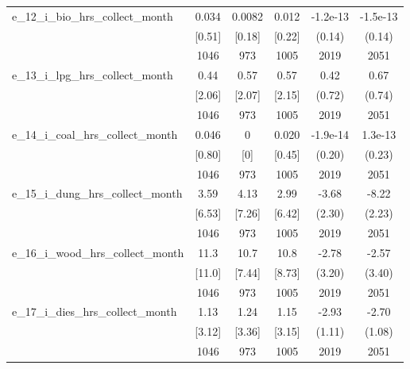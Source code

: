 \begin{table}[htbp]
\begin{tabular*}{0.9\hsize}{@{\hskip\tabcolsep\extracolsep\fill}l*{1}{ccccc}}
e\_12\_i\_bio\_hrs\_collect\_month    &    0.034&   0.0082&    0.012& -1.2e-13         & -1.5e-13         \\
                                &   [0.51]&   [0.18]&   [0.22]&   (0.14)         &   (0.14)         \\
                                &     1046&      973&     1005&     2019         &     2051         \\
e\_13\_i\_lpg\_hrs\_collect\_month    &     0.44&     0.57&     0.57&     0.42         &     0.67         \\
                                &   [2.06]&   [2.07]&   [2.15]&   (0.72)         &   (0.74)         \\
                                &     1046&      973&     1005&     2019         &     2051         \\
e\_14\_i\_coal\_hrs\_collect\_month   &    0.046&        0&    0.020& -1.9e-14         &  1.3e-13         \\
                                &   [0.80]&      [0]&   [0.45]&   (0.20)         &   (0.23)         \\
                                &     1046&      973&     1005&     2019         &     2051         \\
e\_15\_i\_dung\_hrs\_collect\_month   &     3.59&     4.13&     2.99&    -3.68         &    -8.22\sym{***}\\
                                &   [6.53]&   [7.26]&   [6.42]&   (2.30)         &   (2.23)         \\
                                &     1046&      973&     1005&     2019         &     2051         \\
e\_16\_i\_wood\_hrs\_collect\_month   &     11.3&     10.7&     10.8&    -2.78         &    -2.57         \\
                                &   [11.0]&   [7.44]&   [8.73]&   (3.20)         &   (3.40)         \\
                                &     1046&      973&     1005&     2019         &     2051         \\
e\_17\_i\_dies\_hrs\_collect\_month   &     1.13&     1.24&     1.15&    -2.93\sym{***}&    -2.70\sym{**} \\
                                &   [3.12]&   [3.36]&   [3.15]&   (1.11)         &   (1.08)         \\
                                &     1046&      973&     1005&     2019         &     2051         \\

\end{tabular*}
\end{table}
